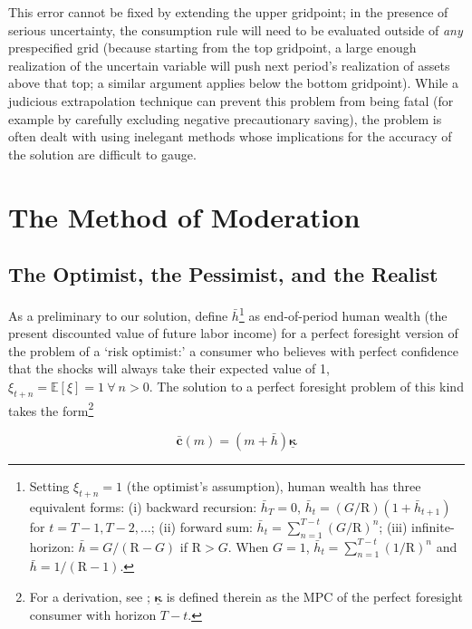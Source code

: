 \documentclass[preprint,authoryear]{elsarticle}
\newcommand{\Ex}{\mathbf{\mathbb{E}}}
\newcommand{\Rfree}{\text{R}}
\newcommand{\tranShk}{\xi}
\newcommand{\PermGroFac}{G}
\newcommand{\mNrm}{m}
\newcommand{\cFunc}{\mathbf{c}}
\newcommand{\cFuncOpt}{\bar{\cFunc}}
\newcommand{\hNrm}{h}
\newcommand{\hNrmOpt}{\bar{\hNrm}}
\newcommand{\MPC}{\boldsymbol{\kappa}}
\newcommand{\MPCmin}{\underline{\MPC}}
\begin{document}
This error cannot be fixed by extending the upper gridpoint; in the presence of
serious uncertainty, the consumption rule will need to be evaluated outside of
\textit{any} prespecified grid (because starting from the top gridpoint, a large enough
realization of the uncertain variable will push next period's realization of
assets above that top; a similar argument applies below the bottom gridpoint).
While a judicious extrapolation technique can prevent this problem from being
fatal (for example by carefully excluding negative precautionary saving), the
problem is often dealt with using inelegant methods whose implications for the
accuracy of the solution are difficult to gauge.

\section{The Method of Moderation}

\subsection{The Optimist, the Pessimist, and the Realist}

As a preliminary to our solution, define $\hNrmOpt$\footnote{Setting $\tranShk_{t+n}=1$ (the optimist's assumption), human wealth has three equivalent forms: (i) backward recursion: $\hNrmOpt_{T} = 0$, $\hNrmOpt_{t} = (\PermGroFac/\Rfree)(1 + \hNrmOpt_{t+1})$ for $t = T -1, T -2, \ldots$; (ii) forward sum: $\hNrmOpt_{t} = \sum_{n=1}^{T -t}(\PermGroFac/\Rfree)^{n}$; (iii) infinite-horizon: $\hNrmOpt = \PermGroFac/(\Rfree -\PermGroFac)$ if $\Rfree>\PermGroFac$. When $\PermGroFac=1$, $\hNrmOpt_{t} = \sum_{n=1}^{T -t}(1/\Rfree)^{n}$ and $\hNrmOpt = 1/(\Rfree -1)$.}
as end-of-period human wealth (the present discounted value of future labor
income) for a perfect foresight version of the problem of a `risk optimist:' a
consumer who believes with perfect confidence that the shocks will
always take their expected value of 1,
$\tranShk_{t+n} = \Ex[\tranShk]=1~\forall~n>0$. The solution to a perfect
foresight problem of this kind takes the form\footnote{For a derivation, see \citet{CarrollShanker2024}; $\MPCmin$ is defined therein as the MPC of the perfect foresight consumer with horizon $T -t$.}

\begin{equation}
\label{eq:cFuncOpt}
\cFuncOpt(\mNrm) = (\mNrm + \hNrmOpt)\MPCmin
\end{equation}
\end{document}
